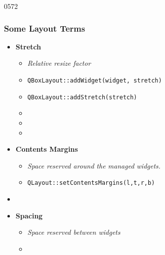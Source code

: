 \begin{slide}{0572}\frametitle{Some Layout Terms}
\begin{itemize}
\item \textbf{Stretch}
  \begin{itemize}
  \item \emph{Relative resize factor  }
  \item \texttt{QBoxLayout::addWidget(widget, stretch)}
  \item \texttt{QBoxLayout::addStretch(stretch)}
  \item {}
  \item {}
  \item[\strut] 
  \end{itemize}
\item \textbf{Contents Margins}
  \begin{itemize}
  \item \emph{Space reserved \textit{around} the managed widgets.}
  \item \texttt{QLayout::setContentsMargins(l,t,r,b)}
  \end{itemize}
  \item[] 
\item \textbf{Spacing}
  \begin{itemize}
  \item \emph{Space reserved \textit{between} widgets}
  \item {}
  \end{itemize}
\end{itemize}
\end{slide}

